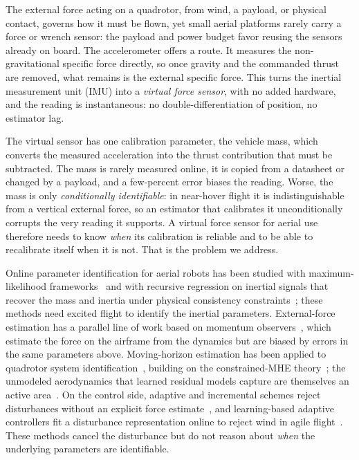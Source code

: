 \documentclass[lettersize,journal]{IEEEtran}
\begin{document}
The external force acting on a quadrotor, from wind, a payload, or physical
contact, governs how it must be flown, yet small aerial platforms rarely carry a
force or wrench sensor: the payload and power budget favor reusing the sensors
already on board. The accelerometer offers a route. It measures the
non-gravitational specific force directly, so once gravity and the commanded
thrust are removed, what remains is the external specific force. This turns the
inertial measurement unit (IMU) into a \emph{virtual force sensor}, with no added
hardware, and the reading is instantaneous: no double-differentiation of position,
no estimator lag.

The virtual sensor has one calibration parameter, the vehicle mass, which converts
the measured acceleration into the thrust contribution that must be subtracted.
The mass is rarely measured online, it is copied from a datasheet or changed by a
payload, and a few-percent error biases the reading. Worse, the mass is only
\emph{conditionally identifiable}: in near-hover flight it is indistinguishable
from a vertical external force, so an estimator that calibrates it unconditionally
corrupts the very reading it supports. A virtual force sensor for aerial use therefore needs
to know \emph{when} its calibration is reliable and to be able to recalibrate
itself when it is not. That is the problem we address.

Online parameter identification for aerial robots has been studied with
maximum-likelihood frameworks~\cite{burri2018system} and with recursive
regression on inertial signals that recover the mass and inertia under physical
consistency constraints~\cite{wuest2019online,wensing2017geometric}; these
methods need excited flight to identify the inertial parameters. External-force
estimation has a parallel line of work based on momentum
observers~\cite{tomic2017external,ruggiero2014impedance,yuksel2014nonlinear}, which estimate the
force on the airframe from the dynamics but are biased by errors in the same
parameters above. Moving-horizon estimation has been applied to quadrotor system
identification~\cite{wang2023neuromhe}, building on the constrained-MHE
theory~\cite{rao2003constrained}; the unmodeled aerodynamics that learned
residual models capture are themselves an active
area~\cite{bauersfeld2021neurobem,torrente2021data}. On the control side,
adaptive and incremental schemes reject disturbances without an explicit force
estimate~\cite{smeur2016adaptive,hanover2022performance,chen2016disturbance}, and learning-based adaptive controllers fit a
disturbance representation online to reject wind in agile
flight~\cite{oconnell2022neuralfly}. These methods cancel the disturbance but do
not reason about \emph{when} the underlying parameters are identifiable.
\end{document}
